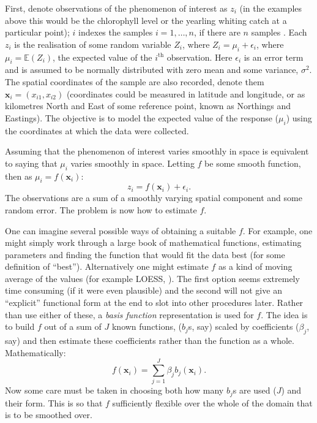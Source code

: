 First, denote observations of the phenomenon of interest as $z_i$ (in the examples above this would be the chlorophyll level or the yearling whiting catch at a particular point); $i$ indexes the samples $i=1,\ldots,n$, if there are $n$ samples . Each  $z_i$ is the realisation of some random variable $Z_i$, where $Z_i=\mu_i+\epsilon_i$, where $\mu_i=\mathbb{E}(Z_i)$, the expected value of the $i^\text{th}$ observation. Here $\epsilon_i$ is an error term and is assumed to be normally distributed with zero mean and some variance, $\sigma^2$. The spatial coordinates of the sample are also recorded, denote them $\mathbf{x}_i = (x_{i1}, x_{i2})$ (coordinates could be measured in latitude and longitude, or as kilometres North and East of some reference point, known as Northings and Eastings). The objective is to model the expected value of the response ($\mu_i$) using the coordinates at which the data were collected.

Assuming that the phenomenon of interest varies smoothly in space is equivalent to saying that $\mu_i$ varies smoothly in space. Letting $f$ be some smooth function, then as $\mu_i = f(\mathbf{x}_i)$:
\begin{equation*}
z_i = f(\mathbf{x}_i) + \epsilon_i.
\end{equation*}
The observations are a sum of a smoothly varying spatial component and some random error. The problem is now how to estimate $f$.

One can imagine several possible ways of obtaining a suitable $f$. For example, one might simply work through a large book of mathematical functions, estimating parameters and finding the function that would fit the data best (for some definition of ``best''). Alternatively one might estimate $f$ as a kind of moving average of the values (for example LOESS, \cite{loess2}). The first option seems extremely time consuming (if it were even plausible) and the second will not give an ``explicit'' functional form at the end to slot into other procedures later. Rather than use either of these, a \textit{basis function} representation is used for $f$. The idea is to build $f$ out of a sum of $J$ known functions, ($b_j$s, say) scaled by coefficients ($\beta_j$, say) and then estimate these coefficients rather than the function as a whole. Mathematically:
\begin{equation}
 f(\mathbf{x}_{i}) = \sum_{j=1}^J \beta_j b_j(\mathbf{x}_{i}).
\label{intro-basisdecomp}
\end{equation}
Now some care must be taken in choosing both how many $b_j$s are used ($J$) and their form. This is so that $f$ sufficiently flexible over the whole of the domain that is to be smoothed over. 

